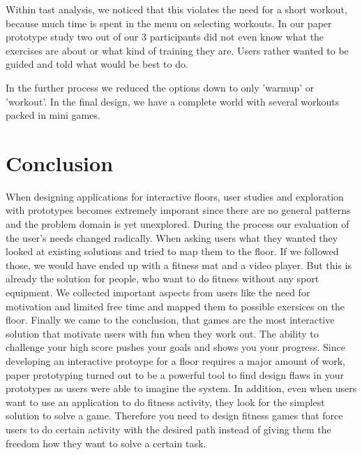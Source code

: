 \documentclass{sigchi}
\begin{document}
    Within tast analysis, we noticed that this violates the need for a short workout, because much time is spent in the menu on selecting workouts. In our paper  prototype study two out of our 3 participants did not even know what the exercises are about or what kind of training they are. Users rather wanted to be     guided and told what would be best to do.

    In the further process we reduced the options down to only 'warmup' or 'workout'. In the final design, we have a complete world with several workouts packed  in mini games.


\section{Conclusion}

  When designing applications for interactive floors, user studies and exploration with prototypes becomes extremely imporant since there are no general patterns and the problem domain is yet unexplored. During the process our evaluation of the user's needs changed radically. When asking users what they wanted they looked at existing solutions and tried to map them to the floor. If we followed those, we would have ended up with a fitness mat and a video player. But this is already the solution for people, who want to do fitness without any sport equipment. We collected important aspects from users like the need for motivation and limited free time and mapped them to possible exersices on the floor. Finally we came to the conclusion, that games are the most interactive solution that motivate users with fun when they work out. The ability to challenge your high score pushes your goals and shows you your progress. 
    Since developing an interactive protoype for a floor requires a major amount of work, paper prototyping turned out to be a powerful tool to find design flaws in your prototypes as users were able to imagine the system.
    In addition, even when users want to use an application to do fitness activity, they look for the simplest solution to solve a game. Therefore you need to design fitness games that force users to do certain activity with the desired path instead of giving them the freedom how they want to solve a certain task.
\end{document}
